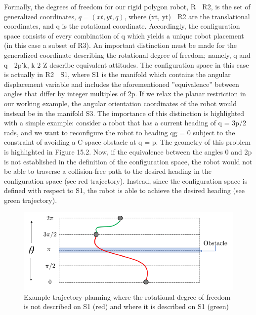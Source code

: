 \documentclass[twoside]{article}
\begin{document}
Formally, the degrees of freedom for our rigid polygon robot, R  R2, is the set of generalized coordinates, $q = (xt, yt, q)$, where (xt, yt)  R2 are the translational coordinates, and q is the rotational coordinate. Accordingly, the configuration space consists of every combination of q which yields a unique robot placement (in this case a subset of R3). An important distinction must be made for the generalized
coordinate describing the rotational degree of freedom; namely, q and q  2p˙k, k 2 Z describe equivalent attitudes. The configuration space in this case is actually in R2  S1, where S1 is the manifold which contains the angular displacement variable and includes the aforementioned ”equivalence” between angles that differ by integer multiples of 2p. If we relax the planar restriction in our working example,
the angular orientation coordinates of the robot would instead be in the manifold S3. The importance of this distinction is highlighted with a simple example: consider a robot that has a current heading of q = 3p/2 rads, and we want to reconfigure the robot to heading qg = 0 subject to the constraint of avoiding a C-space obstacle at q = p. The geometry of this problem is highlighted in Figure 15.2. Now, if the equivalence between the angles 0 and 2p is not established in the definition of the configuration space,
the robot would not be able to traverse a collision-free path to the desired heading in the configuration space (see red trajectory). Instead, since the configuration space is defined with respect to S1, the robot is able to achieve the desired heading (see green trajectory).

\begin{figure}[h]
\begin{center}
\includegraphics{fig15_2.PNG}
\caption{Example trajectory planning where the rotational degree of freedom is not described on S1 (red) and where it is described on S1 (green)}
\end{center}
\end{figure}
\end{document}
